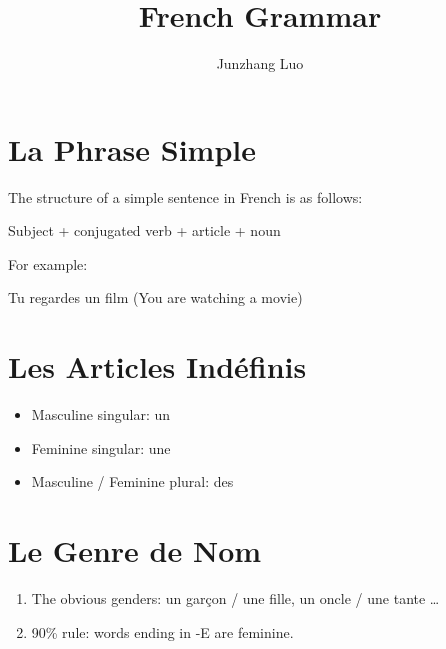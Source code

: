 \documentclass{book}
\title{French Grammar}
\author{Junzhang Luo}
\begin{document}
\tableofcontents

\chapter{La Phrase Simple}
    The structure of a simple sentence in French is as follows:
    \begin{center}
        Subject + conjugated verb + article + noun
    \end{center}
    For example:
    \begin{center}
        Tu regardes un film (You are watching a movie)
    \end{center}

\chapter{Les Articles Indéfinis}
    \begin{itemize}
        \item Masculine singular: un
        \item Feminine singular: une
        \item Masculine / Feminine plural: des
    \end{itemize}

\chapter{Le Genre de Nom}
    \begin{enumerate}
        \item The obvious genders: un garçon / une fille, un oncle / une tante \dots
        \item 90\% rule: words ending in -E are feminine.
    \end{enumerate}
\end{document}
